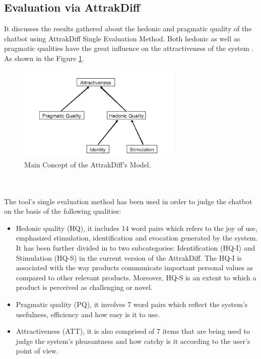 \subsection{Evaluation via AttrakDiff}
It discusses the results gathered about the hedonic and pragmatic quality of the chatbot using AttrakDiff Single Evaluation Method. Both hedonic as well as pragmatic qualities have the great influence on the attractiveness of the system \cite{inflOfHedandPrag}. As shown in the Figure \ref{fig:attrakMod}.

\begin{figure}[!h]
    \centering
    \includegraphics[width=0.7\textwidth]{img/AttrakDiff_Model.PNG}
    \caption{Main Concept of the AttrakDiff's Model. \cite{inflOfHedandPrag}}
    \label{fig:attrakMod}
\end{figure}
\\~\\
The tool's single evaluation method has been used in order to judge the chatbot on the basis of the following qualities:
\begin{itemize}
    \item Hedonic quality (HQ), it includes 14 word pairs which refers to the joy of use, emphasized stimulation, identification and evocation generated by the system. It has been further divided in to two subcategories: Identification (HQ-I) and Stimulation (HQ-S) in the current version of the AttrakDiff. The HQ-I is associated with the way products communicate important personal values as compared to other relevant products. Moreover, HQ-S is an extent to which a product is perceived as challenging or novel.
    \item Pragmatic quality (PQ), it involves 7 word pairs which reflect the system's usefulness, efficiency and how easy is it to use.
    \item Attractiveness (ATT), it is also comprised of 7 items that are being used to judge the system's pleasantness and how catchy is it according to the user's point of view.
\end{itemize} 

